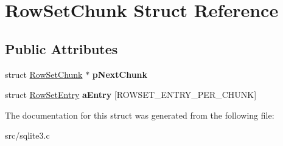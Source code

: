 \hypertarget{struct_row_set_chunk}{\section{Row\-Set\-Chunk Struct Reference}
\label{struct_row_set_chunk}
}
\subsection*{Public Attributes}
\begin{DoxyCompactItemize}
\item 
\hypertarget{struct_row_set_chunk_ae8f0975c86633ae2bb8b212d3a767554}{struct \hyperlink{struct_row_set_chunk}{Row\-Set\-Chunk} $\ast$ {\bfseries p\-Next\-Chunk}}\label{struct_row_set_chunk_ae8f0975c86633ae2bb8b212d3a767554}

\item 
\hypertarget{struct_row_set_chunk_abde97bbb07c3bf9454e719ff860bdd1f}{struct \hyperlink{struct_row_set_entry}{Row\-Set\-Entry} {\bfseries a\-Entry} \mbox{[}R\-O\-W\-S\-E\-T\-\_\-\-E\-N\-T\-R\-Y\-\_\-\-P\-E\-R\-\_\-\-C\-H\-U\-N\-K\mbox{]}}\label{struct_row_set_chunk_abde97bbb07c3bf9454e719ff860bdd1f}

\end{DoxyCompactItemize}


The documentation for this struct was generated from the following file\-:\begin{DoxyCompactItemize}
\item 
src/sqlite3.\-c\end{DoxyCompactItemize}
